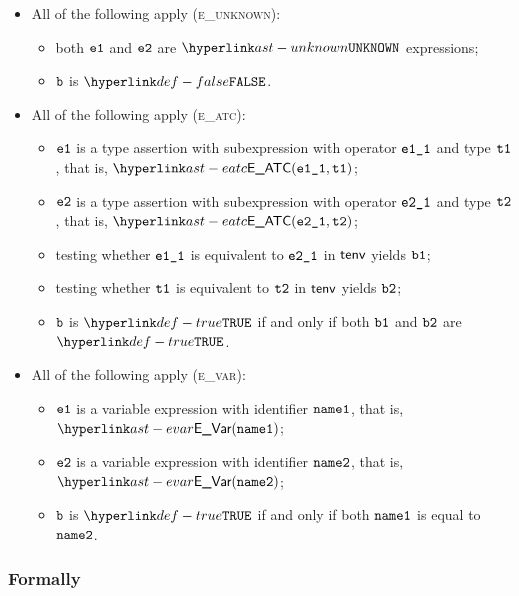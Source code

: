 \begin{itemize}
  \item All of the following apply (\textsc{e\_unknown}):
  \begin{itemize}
    \item both $\veone$ and $\vetwo$ are $\UNKNOWN$ expressions;
    \item $\vb$ is $\False$.
  \end{itemize}

  \item All of the following apply (\textsc{e\_atc}):
  \begin{itemize}
    \item $\veone$ is a type assertion with subexpression with operator $\veoneone$ and type $\vtone$,
          that is, $\EATC(\veoneone, \vtone)$;
    \item $\vetwo$ is a type assertion with subexpression with operator $\vetwoone$ and type $\vttwo$,
          that is, $\EATC(\vetwoone, \vttwo)$;
    \item testing whether $\veoneone$ is equivalent to $\vetwoone$ in $\tenv$ yields $\vbone$;
    \item testing whether $\vtone$ is equivalent to $\vttwo$ in $\tenv$ yields $\vbtwo$;
    \item $\vb$ is $\True$ if and only if both $\vbone$ and $\vbtwo$ are $\True$.
  \end{itemize}

  \item All of the following apply (\textsc{e\_var}):
  \begin{itemize}
    \item $\veone$ is a variable expression with identifier $\nameone$, that is, $\EVar(\nameone)$;
    \item $\vetwo$ is a variable expression with identifier $\nametwo$, that is, $\EVar(\nametwo)$;
    \item $\vb$ is $\True$ if and only if both $\nameone$ is equal to $\nametwo$.
  \end{itemize}
\end{itemize}

\subsubsection{Formally}
\begin{mathpar}
\end{mathpar}

